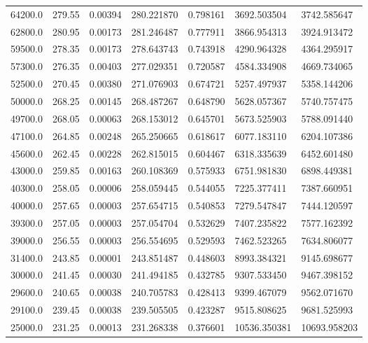 \begin{tabular}{lllllll}
   64200.0 &   279.55 & 0.00394 &    280.221870 &          0.798161 &  3692.503504 &  3742.585647 \\
   62800.0 &   280.95 & 0.00173 &    281.246487 &          0.777911 &  3866.954313 &  3924.913472 \\
   59500.0 &   278.35 & 0.00173 &    278.643743 &          0.743918 &  4290.964328 &  4364.295917 \\
   57300.0 &   276.35 & 0.00403 &    277.029351 &          0.720587 &  4584.334908 &  4669.734065 \\
   52500.0 &   270.45 & 0.00380 &    271.076903 &          0.674721 &  5257.497937 &  5358.144206 \\
   50000.0 &   268.25 & 0.00145 &    268.487267 &          0.648790 &  5628.057367 &  5740.757475 \\
   49700.0 &   268.05 & 0.00063 &    268.153012 &          0.645701 &  5673.525903 &  5788.091440 \\
   47100.0 &   264.85 & 0.00248 &    265.250665 &          0.618617 &  6077.183110 &  6204.107386 \\
   45600.0 &   262.45 & 0.00228 &    262.815015 &          0.604467 &  6318.335639 &  6452.601480 \\
   43000.0 &   259.85 & 0.00163 &    260.108369 &          0.575933 &  6751.981830 &  6898.449381 \\
   40300.0 &   258.05 & 0.00006 &    258.059445 &          0.544055 &  7225.377411 &  7387.660951 \\
   40000.0 &   257.65 & 0.00003 &    257.654715 &          0.540853 &  7279.547847 &  7444.120597 \\
   39300.0 &   257.05 & 0.00003 &    257.054704 &          0.532629 &  7407.235822 &  7577.162392 \\
   39000.0 &   256.55 & 0.00003 &    256.554695 &          0.529593 &  7462.523265 &  7634.806077 \\
   31400.0 &   243.85 & 0.00001 &    243.851487 &          0.448603 &  8993.384321 &  9145.698677 \\
   30000.0 &   241.45 & 0.00030 &    241.494185 &          0.432785 &  9307.533450 &  9467.398152 \\
   29600.0 &   240.65 & 0.00038 &    240.705783 &          0.428413 &  9399.467079 &  9562.071670 \\
   29100.0 &   239.45 & 0.00038 &    239.505505 &          0.423287 &  9515.808625 &  9681.525993 \\
   25000.0 &   231.25 & 0.00013 &    231.268338 &          0.376601 & 10536.350381 & 10693.958203 \\

\end{tabular}

